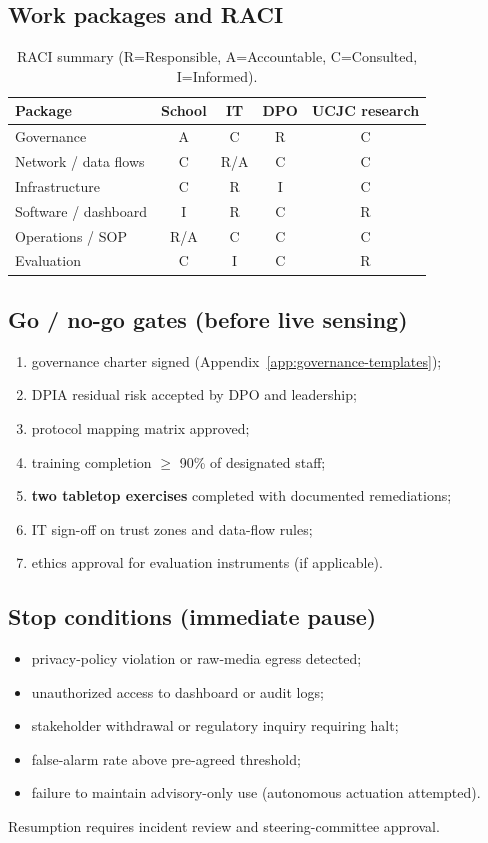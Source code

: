 \subsection{Work packages and RACI}

\begin{table}[htbp]
  \centering
  \caption{RACI summary (R=Responsible, A=Accountable, C=Consulted, I=Informed).}
  \label{tab:raci}
  \footnotesize
  \begin{tabular}{@{}lcccc@{}}
    \toprule
    Package & School & IT & DPO & UCJC research \\
    \midrule
    Governance & A & C & R & C \\
    Network / data flows & C & R/A & C & C \\
    Infrastructure & C & R & I & C \\
    Software / dashboard & I & R & C & R \\
    Operations / SOP & R/A & C & C & C \\
    Evaluation & C & I & C & R \\
    \bottomrule
  \end{tabular}
\end{table}

\subsection{Go / no-go gates (before live sensing)}

\begin{enumerate}[noitemsep]
  \item governance charter signed (Appendix~\ref{app:governance-templates});
  \item DPIA residual risk accepted by DPO and leadership;
  \item protocol mapping matrix approved;
  \item training completion $\geq$ 90\% of designated staff;
  \item \textbf{two tabletop exercises} completed with documented remediations;
  \item IT sign-off on trust zones and data-flow rules;
  \item ethics approval for evaluation instruments (if applicable).
\end{enumerate}

\subsection{Stop conditions (immediate pause)}

\begin{itemize}[noitemsep]
  \item privacy-policy violation or raw-media egress detected;
  \item unauthorized access to dashboard or audit logs;
  \item stakeholder withdrawal or regulatory inquiry requiring halt;
  \item false-alarm rate above pre-agreed threshold;
  \item failure to maintain advisory-only use (autonomous actuation attempted).
\end{itemize}

Resumption requires incident review and steering-committee approval.
